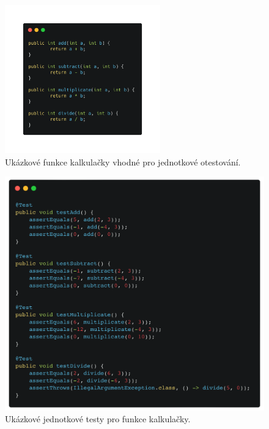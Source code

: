 \documentclass[czech, ma, kiv, he, iso690alph, pdf, viewonly]{fasthesis}
\begin{document}
    \begin{figure}[H]
        \includegraphics[width=0.6\textwidth]{pic/calc_func.png}
        \centering
        \caption{Ukázkové funkce kalkulačky vhodné pro jednotkové otestování.}
        \label{fig:calc_func}
    \end{figure}

    \begin{figure}[H]
        \includegraphics[width=\textwidth]{pic/calc_tests.png}
        \centering
        \caption{Ukázkové jednotkové testy pro funkce kalkulačky.}
        \label{fig:calc_tests}
    \end{figure}
\end{document}
